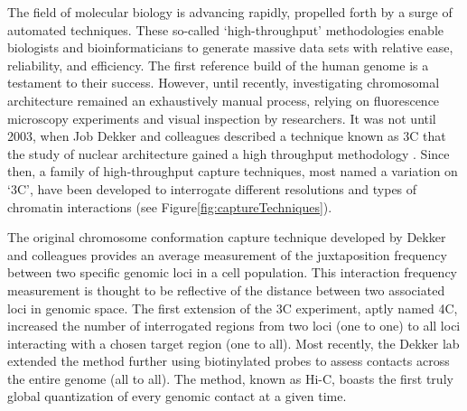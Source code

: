 The field of molecular biology is advancing rapidly, propelled forth by a surge of automated techniques.  These so-called `\gls{high-throughput}'
methodologies enable biologists and bioinformaticians to generate massive data sets with relative ease, reliability, and efficiency.  The first
reference build of the human genome is a testament to their success\cite{hgsc2004}.  However, until recently, investigating chromosomal architecture
remained an exhaustively manual process, relying on fluorescence microscopy experiments and visual inspection by researchers.  It was not until 2003,
when Job Dekker and colleagues described a technique known as \gls{3C} that the study of nuclear architecture gained a high throughput methodology
\cite{dekker2002}. Since then, a family of high-throughput capture techniques, most named a variation on `\gls{3C}', have been developed to interrogate
different resolutions and types of chromatin interactions (see Figure\ref{fig:captureTechniques}).

The original chromosome conformation capture technique developed by Dekker and colleagues provides an average measurement of the juxtaposition frequency
between two specific genomic loci in a cell population\cite{frase2014}.  This interaction frequency measurement is thought to be reflective of
the distance between two associated loci in genomic space.  The first extension of the \gls{3C} experiment, aptly named \gls{4C}, increased
the number of interrogated regions from two loci (one to one) to all loci interacting with a chosen target region (one to all)\cite{simonis2006}.  Most
recently, the Dekker lab extended the method further using biotinylated probes to assess contacts across the entire genome (all to all)\cite{berkum2010}.
The method, known as Hi-C, boasts the first truly global quantization of every genomic contact at a given time.

